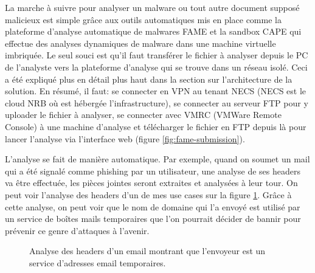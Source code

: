 La marche à suivre pour analyser un malware ou tout autre document supposé malicieux est simple grâce aux outils automatiques mis en place comme la plateforme d'analyse automatique de malwares FAME et la sandbox CAPE qui effectue des analyses dynamiques de malware dans une machine virtuelle imbriquée. Le seul souci est qu'il faut transférer le fichier à analyser depuis le PC de l'analyste vers la plateforme d'analyse qui se trouve dans un réseau isolé. Ceci a été expliqué plus en détail plus haut dans la section sur l'architecture de la solution. En résumé, il faut: se connecter en VPN au tenant NECS (NECS est le cloud NRB où est hébergée l'infrastructure), se connecter au serveur FTP pour y uploader le fichier à analyser, se connecter avec VMRC (VMWare Remote Console) à une machine d'analyse et télécharger le fichier en FTP depuis là pour lancer l'analyse via l'interface web (figure \ref{fig:fame-submission}).

L'analyse se fait de manière automatique. Par exemple, quand on soumet un mail qui a été signalé comme phishing par un utilisateur, une analyse de ses headers va être effectuée, les pièces jointes seront extraites et analysées à leur tour. On peut voir l'analyse des headers d'un de mes use cases sur la figure \ref{fig:fame-email-headers}. Grâce à cette analyse, on peut voir que le nom de domaine qui l'a envoyé est utilisé par un service de boîtes mails temporaires que l'on pourrait décider de bannir pour prévenir ce genre d'attaques à l'avenir.

\begin{figure}
    \centering
    \caption{Analyse des headers d'un email montrant que l'envoyeur est un service d'adresses email temporaires.}
    \label{fig:fame-email-headers}
\end{figure}

